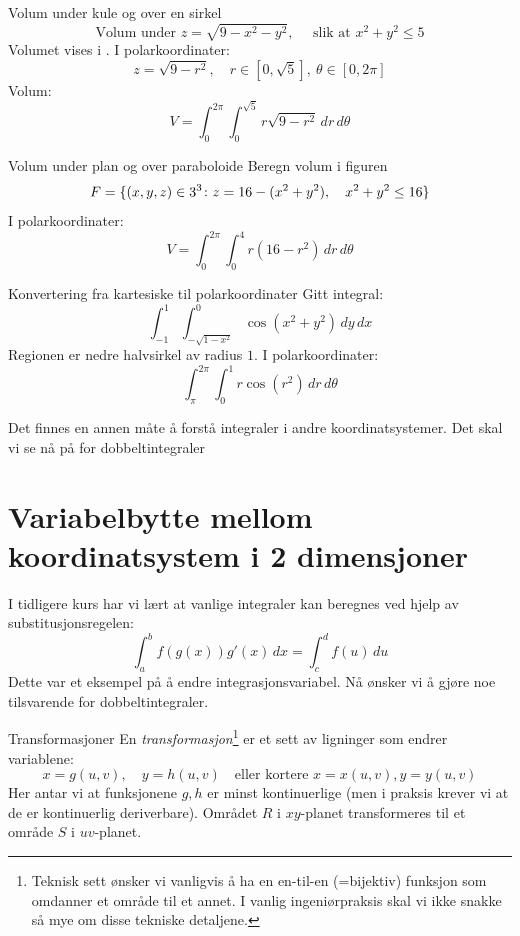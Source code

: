 \begin{eks}{Volum under kule og over en sirkel} 
\[\text{Volum under }
z = \sqrt{9 - x^2 - y^2}, \quad \text{ slik at }x^2 + y^2 \leq 5
\]
Volumet vises i . I polarkoordinater:
\[
z = \sqrt{9 - r^2}, \quad r \in [0, \sqrt{5}],\ \theta \in [0, 2\pi]
\]
Volum:
\[
V = \int_0^{2\pi} \int_0^{\sqrt{5}} r \sqrt{9 - r^2} \, dr\, d\theta
\]\label{syl:sph:inter}
\end{eks}
\begin{eks}{Volum under plan og over paraboloide}
Beregn volum i figuren
\[
F=\{(x,y,z) \in 3^3 \colon z = 16 - (x^2 + y^2), \quad x^2 + y^2 \leq 16\}
\]
I polarkoordinater:
\[
V = \int_0^{2\pi} \int_0^4 r(16 - r^2) \, dr\, d\theta
\]
\end{eks}
\begin{eks}{Konvertering fra kartesiske til polarkoordinater}
Gitt integral:
\[
\int_{-1}^1 \int_{-\sqrt{1 - x^2}}^0 \cos(x^2 + y^2)\, dy\, dx
\]
Regionen er nedre halvsirkel av radius $1$. I polarkoordinater:
\[
\int_\pi^{2\pi} \int_0^1 r \cos(r^2) \, dr\, d\theta
\]
\end{eks}

Det finnes en annen måte å forstå integraler i andre koordinatsystemer. Det skal vi se nå på for dobbeltintegraler

\section{Variabelbytte mellom koordinatsystem i 2 dimensjoner}\label{sect:varbytte2d}
I tidligere kurs har vi lært at vanlige integraler kan beregnes ved hjelp av substitusjonsregelen:
\[
\int_a^b f(g(x)) g'(x)\, dx = \int_c^d f(u)\, du
\]
Dette var et eksempel på å endre integrasjonsvariabel. Nå ønsker vi å gjøre noe tilsvarende for dobbeltintegraler.

\begin{defn}{Transformasjoner}
En \emph{transformasjon}\footnote{Teknisk sett ønsker vi vanligvis å ha en en-til-en (=bijektiv) funksjon som omdanner et område til et annet. I vanlig ingeniørpraksis skal vi ikke snakke så mye om disse tekniske detaljene.} er et sett av ligninger som endrer variablene:
\[
x = g(u, v), \quad y = h(u, v)\quad \text{eller kortere } x=x(u,v), y=y(u,v)
\]
Her antar vi at funksjonene $g,h$ er minst kontinuerlige (men i praksis krever vi at de er kontinuerlig deriverbare). Området $R$ i $xy$-planet transformeres til et område $S$ i $uv$-planet. 
\end{defn}

